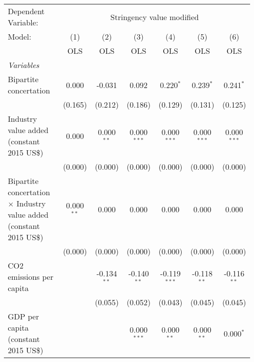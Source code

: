 
\begingroup
\centering
\begin{tabular}{lcccccc}
   \toprule
   Dependent Variable: & \multicolumn{6}{c}{Stringency value modified}\\
   Model:                                                                      & (1)          & (2)           & (3)           & (4)            & (5)            & (6)\\  
                                                                               &  OLS         & OLS           & OLS           & OLS            & OLS            & OLS\\  
   \midrule
   \emph{Variables}\\
   Bipartite concertation                                                      & 0.000        & -0.031        & 0.092         & 0.220$^{*}$    & 0.239$^{*}$    & 0.241$^{*}$\\   
                                                                               & (0.165)      & (0.212)       & (0.186)       & (0.129)        & (0.131)        & (0.125)\\   
   Industry value added (constant 2015 US\$)                                   & 0.000        & 0.000$^{**}$  & 0.000$^{***}$ & 0.000$^{***}$  & 0.000$^{***}$  & 0.000$^{***}$\\   
                                                                               & (0.000)      & (0.000)       & (0.000)       & (0.000)        & (0.000)        & (0.000)\\   
   Bipartite concertation $\times$ Industry value added (constant 2015 US\$)   & 0.000$^{**}$ & 0.000         & 0.000         & 0.000          & 0.000          & 0.000\\   
                                                                               & (0.000)      & (0.000)       & (0.000)       & (0.000)        & (0.000)        & (0.000)\\   
   CO2 emissions per capita                                                    &              & -0.134$^{**}$ & -0.140$^{**}$ & -0.119$^{***}$ & -0.118$^{**}$  & -0.116$^{**}$\\   
                                                                               &              & (0.055)       & (0.052)       & (0.043)        & (0.045)        & (0.045)\\   
   GDP per capita (constant 2015 US\$)                                         &              &               & 0.000$^{***}$ & 0.000$^{**}$   & 0.000$^{**}$   & 0.000$^{*}$\\   

\end{tabular}
